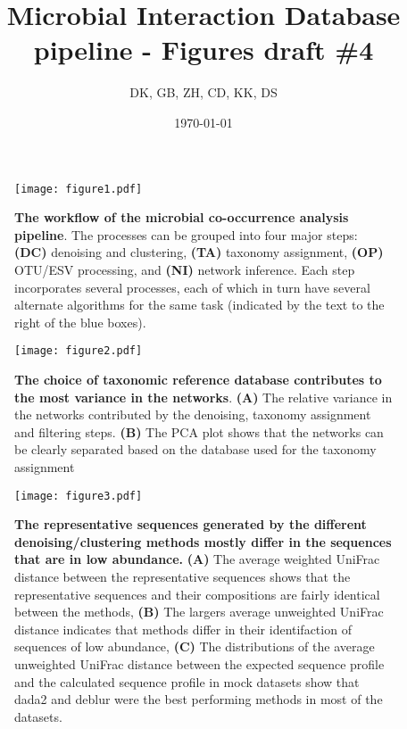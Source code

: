 




\title{ \huge Microbial Interaction Database pipeline - Figures draft \#4 }
\author{DK, GB, ZH, CD, KK, DS}
\date{\today}



\maketitle

\begin{figure}[h]
  \centering
  \texttt{[image: figure1.pdf]}
  \caption{
    \textbf{The workflow of the microbial co-occurrence analysis pipeline}.
    The processes can be grouped into four major steps: \textbf{(DC)} denoising and clustering, \textbf{(TA)} taxonomy assignment, \textbf{(OP)} OTU/ESV processing, and \textbf{(NI)} network inference.
    Each step incorporates several processes, each of which in turn have several alternate algorithms for the same task (indicated by the text to the right of the blue boxes).
  }
  \label{fig:figure1}
\end{figure}

\begin{figure}[h]
  \centering
  \texttt{[image: figure2.pdf]}
  \caption{
    \textbf{The choice of taxonomic reference database contributes to the most variance in the networks}.
    \textbf{(A)} The relative variance in the networks contributed by the denoising, taxonomy assignment and filtering steps.
    \textbf{(B)} The PCA plot shows that the networks can be clearly separated based on the database used for the taxonomy assignment
  }
  \label{fig:figure2}
\end{figure}

\begin{figure}[h]
  \centering
  \texttt{[image: figure3.pdf]}
  \caption{
    \textbf{The representative sequences generated by the different denoising/clustering methods mostly differ in the sequences that are in low abundance.}
    \textbf{(A)} The average weighted UniFrac distance between the representative sequences shows that the representative sequences and their compositions are fairly identical between the methods,
    \textbf{(B)} The largers average unweighted UniFrac distance indicates that methods differ in their identifaction of sequences of low abundance,
    \textbf{(C)} The distributions of the average unweighted UniFrac distance between the expected sequence profile and the calculated sequence profile in mock datasets show that dada2 and deblur were the best performing methods in most of the datasets.
  }
  \label{fig:figure3}
\end{figure}

